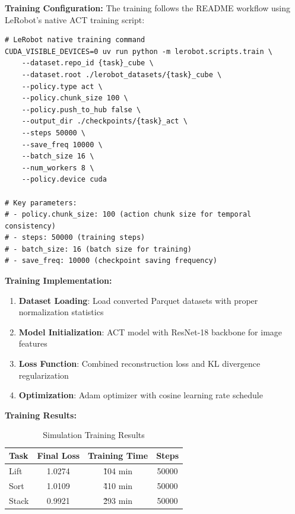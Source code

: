 \documentclass[10pt]{article} %
\begin{document}
\textbf{Training Configuration:} The training follows the README workflow using LeRobot's native ACT training script:

\begin{lstlisting}[caption=LeRobot Native ACT Training Configuration, label=lst:lerobot_training_config]
# LeRobot native training command
CUDA_VISIBLE_DEVICES=0 uv run python -m lerobot.scripts.train \
    --dataset.repo_id {task}_cube \
    --dataset.root ./lerobot_datasets/{task}_cube \
    --policy.type act \
    --policy.chunk_size 100 \
    --policy.push_to_hub false \
    --output_dir ./checkpoints/{task}_act \
    --steps 50000 \
    --save_freq 10000 \
    --batch_size 16 \
    --num_workers 8 \
    --policy.device cuda

# Key parameters:
# - policy.chunk_size: 100 (action chunk size for temporal consistency)
# - steps: 50000 (training steps)
# - batch_size: 16 (batch size for training)
# - save_freq: 10000 (checkpoint saving frequency)
\end{lstlisting}

\textbf{Training Implementation:}
\begin{enumerate}
    \item \textbf{Dataset Loading}: Load converted Parquet datasets with proper normalization statistics
    \item \textbf{Model Initialization}: ACT model with ResNet-18 backbone for image features
    \item \textbf{Loss Function}: Combined reconstruction loss and KL divergence regularization
    \item \textbf{Optimization}: Adam optimizer with cosine learning rate schedule
\end{enumerate}

\textbf{Training Results:}

\begin{table}[H]
    \centering
    \caption{Simulation Training Results}
    \vspace{0.2em}
    \small
    \begin{tabular}{lccc}
        \toprule
        \textbf{Task} & \textbf{Final Loss} & \textbf{Training Time} & \textbf{Steps} \\
        \midrule
        Lift & 1.0274 & \~104 min & 50000 \\
        Sort & 1.0109 & \~410 min & 50000 \\
        Stack & 0.9921 & \~293 min & 50000 \\
        \bottomrule
    \end{tabular}
\end{table}
\end{document}
